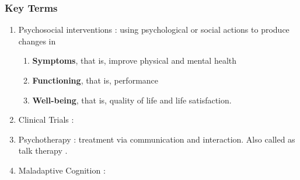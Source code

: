 \documentclass{article}
\begin{document}
\subsubsection{Key Terms}
\begin{enumerate}
    \item Psychosocial interventions : using psychological or social actions to produce changes in
    \begin{enumerate}
        \item \textbf{Symptoms}, that is, improve physical and mental health
        \item \textbf{Functioning}, that is, performance
        \item \textbf{Well-being}, that is, quality of life and life satisfaction.
    \end{enumerate}
    \item Clinical Trials : \cite{ClinicalTrails_WHO}
    \item Psychotherapy : treatment via communication and interaction. Also called as talk therapy \cite{Psychotheraphy_NIH}.
    \item Maladaptive Cognition : 
\end{enumerate}
\end{document}
